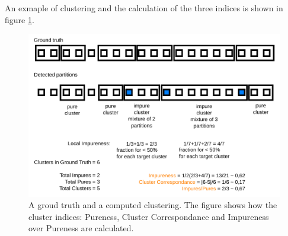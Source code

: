 An exmaple of clustering and the calculation of the three indices is shown
in figure \ref{fig-pureness}.
\begin{figure}
  \begin{center}
  \includegraphics[scale=0.9]{pureness.pdf}
  \caption{A groud truth and a computed clustering. The figure shows how
    the cluster indices: Pureness, Cluster Correspondance and
    Impureness over Pureness are calculated.}
  \label{fig-pureness}
  \end{center}
\end{figure}

